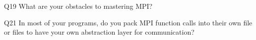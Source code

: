 \begin{description}%
\item{Q19} What are your obstacles to mastering MPI?%
\item{Q21} In most of your programs, do you pack MPI function calls into their own file or files to have your own abstraction layer for communication?%
\end{description}%
